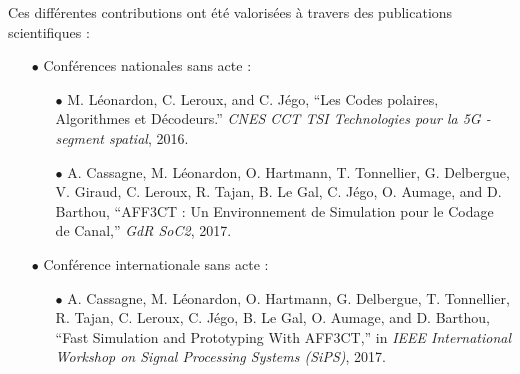 \vspace{1cm}
Ces différentes contributions ont été valorisées à travers des publications scientifiques : \\

\begin{itemize}
		\item[$\bullet$] Conférences nationales sans acte :
	\begin{itemize}
		\item[$\bullet$] M. Léonardon, C. Leroux, and C. Jégo, “Les Codes polaires, Algorithmes et Décodeurs.”
		\textit{CNES CCT TSI Technologies pour la 5G - segment spatial}, 2016.
     	\item[$\bullet$] A. Cassagne, M. Léonardon, O. Hartmann, T. Tonnellier, G. Delbergue, V. Giraud, C. Leroux, R. Tajan, B. Le Gal, C. Jégo, O. Aumage, and D. Barthou, “AFF3CT : Un Environnement de Simulation pour le Codage de Canal,” \textit{GdR SoC2}, 2017.
	\end{itemize}

	\item[$\bullet$] Conférence internationale sans acte :
	\begin{itemize}
		\item[$\bullet$] A. Cassagne, M. Léonardon, O. Hartmann, G. Delbergue, T. Tonnellier, R. Tajan, C. Leroux, C. Jégo, B. Le Gal, O. Aumage, and D. Barthou, “Fast Simulation and Prototyping With AFF3CT,” in \textit{IEEE International Workshop on Signal Processing Systems (SiPS)}, 2017.
	\end{itemize}


\end{itemize}
